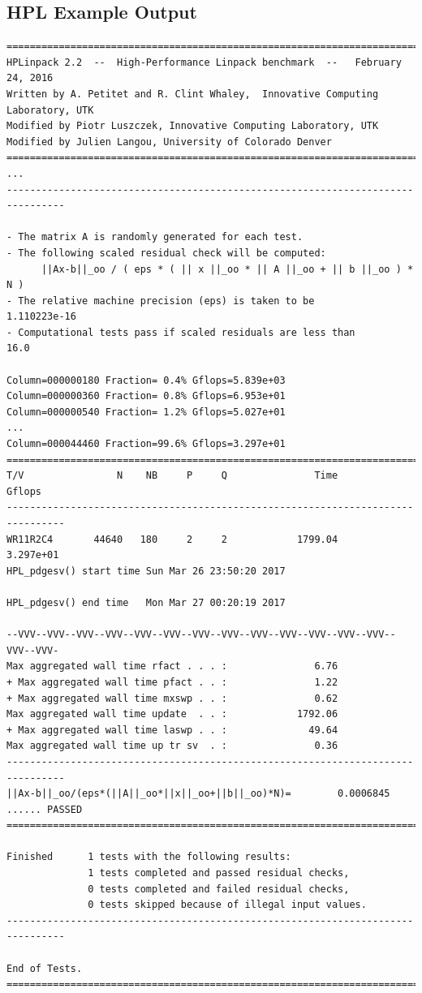 \documentclass{article}
\begin{document}
    \subsection{HPL Example Output}
        \label{appendix:hpl-example-output}


        \begin{verbatim}
================================================================================
HPLinpack 2.2  --  High-Performance Linpack benchmark  --   February 24, 2016
Written by A. Petitet and R. Clint Whaley,  Innovative Computing Laboratory, UTK
Modified by Piotr Luszczek, Innovative Computing Laboratory, UTK
Modified by Julien Langou, University of Colorado Denver
================================================================================
...
--------------------------------------------------------------------------------

- The matrix A is randomly generated for each test.
- The following scaled residual check will be computed:
      ||Ax-b||_oo / ( eps * ( || x ||_oo * || A ||_oo + || b ||_oo ) * N )
- The relative machine precision (eps) is taken to be               1.110223e-16
- Computational tests pass if scaled residuals are less than                16.0

Column=000000180 Fraction= 0.4% Gflops=5.839e+03
Column=000000360 Fraction= 0.8% Gflops=6.953e+01
Column=000000540 Fraction= 1.2% Gflops=5.027e+01
...
Column=000044460 Fraction=99.6% Gflops=3.297e+01
================================================================================
T/V                N    NB     P     Q               Time                 Gflops
--------------------------------------------------------------------------------
WR11R2C4       44640   180     2     2            1799.04              3.297e+01
HPL_pdgesv() start time Sun Mar 26 23:50:20 2017

HPL_pdgesv() end time   Mon Mar 27 00:20:19 2017

--VVV--VVV--VVV--VVV--VVV--VVV--VVV--VVV--VVV--VVV--VVV--VVV--VVV--VVV--VVV-
Max aggregated wall time rfact . . . :               6.76
+ Max aggregated wall time pfact . . :               1.22
+ Max aggregated wall time mxswp . . :               0.62
Max aggregated wall time update  . . :            1792.06
+ Max aggregated wall time laswp . . :              49.64
Max aggregated wall time up tr sv  . :               0.36
--------------------------------------------------------------------------------
||Ax-b||_oo/(eps*(||A||_oo*||x||_oo+||b||_oo)*N)=        0.0006845 ...... PASSED
================================================================================

Finished      1 tests with the following results:
              1 tests completed and passed residual checks,
              0 tests completed and failed residual checks,
              0 tests skipped because of illegal input values.
--------------------------------------------------------------------------------

End of Tests.
================================================================================

        \end{verbatim}
\end{document}
